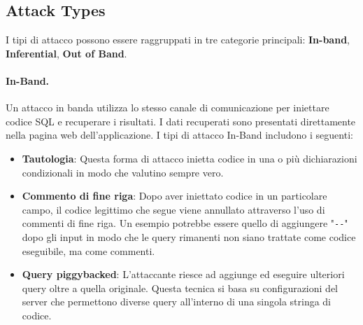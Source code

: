 \subsection{Attack Types}

I tipi di attacco possono essere raggruppati in tre categorie principali:
\textbf{In-band}, \textbf{Inferential}, \textbf{Out of Band}.

\paragraph{In-Band.}
Un attacco in banda utilizza lo stesso canale di comunicazione per iniettare
codice SQL e recuperare i risultati. I dati recuperati sono presentati
direttamente nella pagina web dell'applicazione. I tipi di attacco In-Band
includono i seguenti:

\begin{itemize}
    \item \textbf{Tautologia}: Questa forma di attacco inietta codice in una o
          più dichiarazioni condizionali in modo che valutino sempre vero.
    \item \textbf{Commento di fine riga}: Dopo aver iniettato codice in un
          particolare campo, il codice legittimo che segue viene annullato
          attraverso l'uso di commenti di fine riga. Un esempio potrebbe
          essere quello di aggiungere "\verb|--|" dopo gli input in modo che
          le query rimanenti non siano trattate come codice eseguibile, ma come
          commenti.
    \item \textbf{Query piggybacked}: L'attaccante riesce ad aggiunge ed
          eseguire ulteriori query oltre a quella originale. Questa
          tecnica si basa su configurazioni del server che permettono diverse
          query all'interno di una singola stringa di codice.
\end{itemize}

